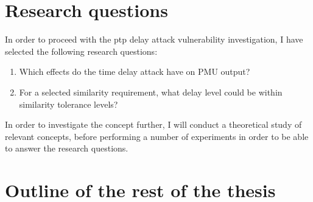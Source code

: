 \section{Research questions}
In order to proceed with the \acrshort{ptp} delay attack vulnerability investigation, I have selected the following research questions:

\begin{enumerate}
    \item Which effects do the time delay attack have on PMU output?
    \item For a selected similarity requirement, what delay level could be within similarity tolerance levels?
    
\end{enumerate}


In order to investigate the concept further, I will conduct a theoretical study of relevant concepts, before performing a number of experiments in order to be able to answer the research questions. 



\section{Outline of the rest of the thesis}



